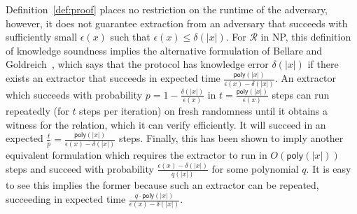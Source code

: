 \begin{remark} Definition~\ref{def:proof} places no restriction on the runtime of the adversary, however, it does not guarantee extraction from an adversary that succeeds with sufficiently small $\epsilon(x)$ such that $\epsilon(x) \leq  \delta(|x|)$. For $\mathcal{R}$ in NP, this definition of knowledge soundness implies the alternative formulation of Bellare and Goldreich~\cite{C:BelGol92}, which says that the protocol has knowledge error $\delta(|x|)$ if there exists an extractor that succeeds in expected time $\frac{\textsf{poly}(|x|)}{\epsilon(x) - \delta(|x|)}$. An extractor which succeeds with probability $p = 1 - \frac{\delta(|x|)}{\epsilon(x)}$ in $t = \frac{\mathsf{poly}(|x|)}{\epsilon(x)}$ steps can run repeatedly (for $t$ steps per iteration) on fresh randomness until it obtains a witness for the relation, which it can verify efficiently. It will succeed in an expected $\frac{t}{p} =  \frac{\textsf{poly}(|x|)}{\epsilon(x) - \delta(|x|)}$ steps. Finally, this has been shown to imply another equivalent formulation which requires the extractor to run in $O(\textsf{poly}(|x|))$ steps and succeed with probability $\frac{\epsilon(x) - \delta(|x|)}{q(|x|)}$ for some polynomial $q$. It is easy to see this implies the former because such an extractor can be repeated, succeeding in expected time $\frac{q \cdot \textsf{poly}(|x|)}{\epsilon(x) - \delta(|x|)}$. 	
\end{remark}



 

